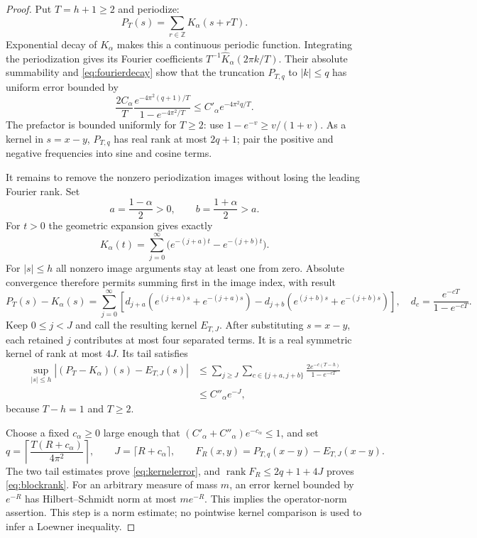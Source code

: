 \documentclass[11pt]{article}
\newcommand{\rank}{\operatorname{rank}}
\begin{document}
\begin{proof}
Put $T=h+1\ge2$ and periodize:
\[
 P_T(s)=\sum_{r\in\mathbb Z}K_\alpha(s+rT).
\]
Exponential decay of $K_\alpha$ makes this a continuous periodic
function. Integrating the periodization gives its Fourier coefficients
$T^{-1}\widehat K_\alpha(2\pi k/T)$. Their absolute summability and
\eqref{eq:fourierdecay} show that the truncation $P_{T,q}$ to
$|k|\le q$ has uniform error bounded by
\begin{equation}\label{eq:periodictail}
 \frac{2C_\alpha}{T}
 \frac{e^{-4\pi^2(q+1)/T}}{1-e^{-4\pi^2/T}}
 \le C'_\alpha e^{-4\pi^2q/T}.
\end{equation}
The prefactor is bounded uniformly for $T\ge2$: use
$1-e^{-v}\ge v/(1+v)$.
As a kernel in $s=x-y$, $P_{T,q}$ has real rank at most $2q+1$;
pair the positive and negative frequencies into sine and cosine terms.

It remains to remove the nonzero periodization images without losing
the leading Fourier rank. Set
\[
 a=\frac{1-\alpha}{2}>0,\qquad b=\frac{1+\alpha}{2}>a.
\]
For $t>0$ the geometric expansion gives exactly
\[
 K_\alpha(t)=\sum_{j=0}^\infty
                  \bigl(e^{-(j+a)t}-e^{-(j+b)t}\bigr).
\]
For $|s|\le h$ all nonzero image arguments stay at least one from
zero. Absolute convergence therefore permits summing first in the
image index, with result
\begin{equation}\label{eq:images}
 P_T(s)-K_\alpha(s)
 =\sum_{j=0}^\infty\left[
 d_{j+a}(e^{(j+a)s}+e^{-(j+a)s})
 -d_{j+b}(e^{(j+b)s}+e^{-(j+b)s})\right],
 \quad d_c=\frac{e^{-cT}}{1-e^{-cT}}.
\end{equation}
Keep $0\le j<J$ and call the resulting kernel $E_{T,J}$.
After substituting $s=x-y$, each retained $j$ contributes at most
four separated terms. It is a real symmetric kernel of rank at most
$4J$. Its tail satisfies
\begin{align*}
 \sup_{|s|\le h}|(P_T-K_\alpha)(s)-E_{T,J}(s)|
 &\le\sum_{j\ge J}\sum_{c\in\{j+a,j+b\}}
                  \frac{2e^{-c(T-h)}}{1-e^{-cT}}\\
 &\le C''_\alpha e^{-J},
\end{align*}
because $T-h=1$ and $T\ge2$.

Choose a fixed $c_\alpha\ge0$ large enough that
$(C'_\alpha+C''_\alpha)e^{-c_\alpha}\le1$, and set
\[
 q=\left\lceil\frac{T(R+c_\alpha)}{4\pi^2}\right\rceil,
 \qquad J=\lceil R+c_\alpha\rceil,
 \qquad F_R(x,y)=P_{T,q}(x-y)-E_{T,J}(x-y).
\]
The two tail estimates prove \eqref{eq:kernelerror}, and
$\rank F_R\le2q+1+4J$ proves \eqref{eq:blockrank}.
For an arbitrary measure of mass $m$, an error kernel bounded by
$e^{-R}$ has Hilbert--Schmidt norm at most $m e^{-R}$.
This implies the operator-norm assertion. This step is a norm
estimate; no pointwise kernel comparison is used to infer a
Loewner inequality.
\end{proof}
\end{document}
